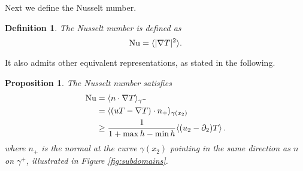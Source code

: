 \documentclass{article}
\newtheorem{definition}{Definition}[section]
\newtheorem{proposition}[theorem]{Proposition}
\theoremstyle{definition}
\theoremstyle{definition}
\newtheorem{remark}{Remark}[section]
\newcommand{\Nu}{{\rm{Nu}}}
\newcommand{\la}{\langle}
\newcommand{\ra}{\rangle}
\begin{document}
Next we define the Nusselt number.

\begin{definition}
    The Nusselt number is defined as
    \begin{equation}\label{nusselt-def}
        \Nu=\la|\nabla T|^2\ra.
    \end{equation}
\end{definition}

It also admits other equivalent representations, as stated in the following.

\begin{proposition}
The Nusselt number satisfies
\begin{align}
    \Nu={}&\langle n \cdot \nabla T \rangle_{\gamma^-}\label{nusselt-bot}\\ 
    ={}& \langle  (uT - \nabla T)\cdot n_+ \rangle_{\gamma(x_2)} \label{nusselt-strip}\\
    \geq{}& \frac{1}{1+\max h -\min h}\langle (u_2-\partial_2)T \rangle\,.\label{nusselt-ineq}
\end{align}
where $n_+$ is the normal at the curve $\gamma(x_2)$ pointing in the same direction as $n$ on $\gamma^+$, illustrated in Figure \ref{fig:subdomains}.
\end{proposition}
\end{document}
